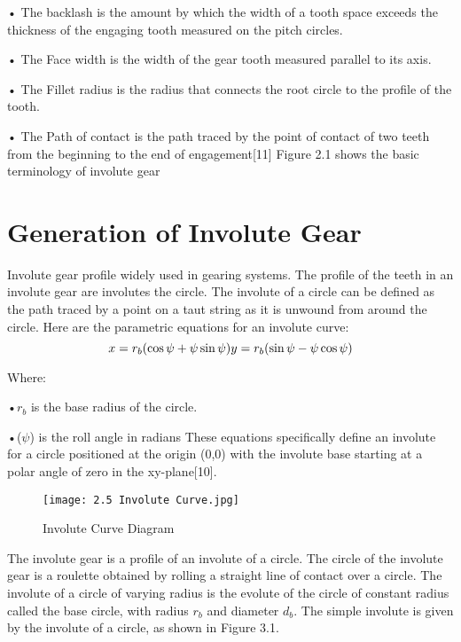 \documentclass{article}
\begin{document}
•	The backlash is the amount by which the width of a tooth space exceeds the thickness of the engaging tooth measured on the pitch circles.

•	The Face width  is the width of the gear tooth measured parallel to its axis.

•	The Fillet radius is the radius that connects the root circle to the profile of the  tooth.

•	The Path of contact  is the path traced by the point of contact of two teeth from the beginning to the end of engagement[11]
Figure 2.1 shows the basic terminology of involute gear \cite{Learnengineering-Gear-Types-11}
\newpage
\section{Generation of Involute Gear}
Involute gear profile widely used in gearing systems. The profile of the teeth in an involute gear are involutes the circle. The involute of a circle can be defined as the path traced by a point on a taut string as it is unwound from around the circle. Here are the parametric equations for an involute curve:
\begin{equation}
    x = r_b (\cos\psi + \psi \sin\psi) \\
    y = r_b (\sin\psi - \psi \cos\psi)
\end{equation}

Where:

•\( r_b \) is the base radius of the circle.

•($\psi$) is the roll angle in radians
These equations specifically define an involute for a circle positioned at the origin (0,0) with the involute base starting at a polar angle of zero in the xy-plane[10].

\begin{figure}[h]
    \centering
    \texttt{[image: 2.5 Involute Curve.jpg]}
    \caption{ Involute Curve Diagram\cite{ChadGlinsky10}}
    \label{fig:enter-label}
\end{figure}

The involute gear is a profile of an involute of a circle. The circle of the involute gear is a roulette obtained by rolling a straight line of contact over a circle. The involute of a circle of varying radius is the evolute of the circle of constant radius called the base circle, with radius \( r_b \) and diameter \( d_b \). The simple involute is given by the involute of a circle, as shown in Figure 3.1.
\end{document}
